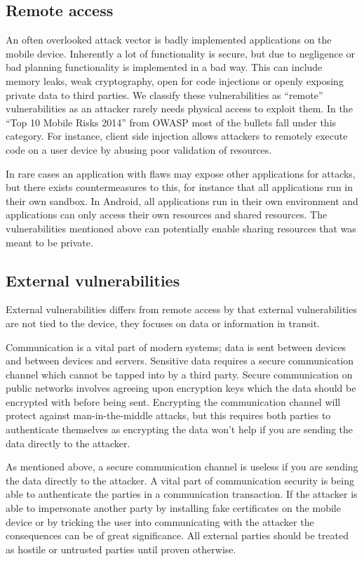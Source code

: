 \subsection{Remote access}
An often overlooked attack vector is badly implemented applications on the mobile device. Inherently a lot of functionality is secure, but due to negligence or bad planning functionality is implemented in a bad way. This can include memory leaks, weak cryptography, open for code injections or openly exposing private data to third parties. We classify these vulnerabilities as ``remote'' vulnerabilities as an attacker rarely needs physical access to exploit them. In the ``Top 10 Mobile Risks 2014'' from OWASP \cite{OWASPTopTenMobile} most of the bullets fall under this category. For instance, client side injection allows attackers to remotely execute code on a user device by abusing poor validation of resources.

In rare cases an application with flaws may expose other applications for attacks, but there exists countermeasures to this, for instance that all applications run in their own sandbox. In Android, all applications run in their own environment and applications can only access their own resources and shared resources. The vulnerabilities mentioned above can potentially enable sharing resources that was meant to be private.

\subsection{External vulnerabilities}
External vulnerabilities differs from remote access by that external vulnerabilities are not tied to the device, they focuses on data or information in transit.

Communication is a vital part of modern systems; data is sent between devices and between devices and servers. Sensitive data requires a secure communication channel which cannot be tapped into by a third party. Secure communication on public networks involves agreeing upon encryption keys which the data should be encrypted with before being sent. Encrypting the communication channel will protect against man-in-the-middle attacks, but this requires both parties to authenticate themselves as encrypting the data won't help if you are sending the data directly to the attacker.

As mentioned above, a secure communication channel is useless if you are sending the data directly to the attacker. A vital part of communication security is being able to authenticate the parties in a communication transaction. If the attacker is able to impersonate another party by installing fake certificates on the mobile device or by tricking the user into communicating with the attacker the consequences can be of great significance. All external parties should be treated as hostile or untrusted parties until proven otherwise.

